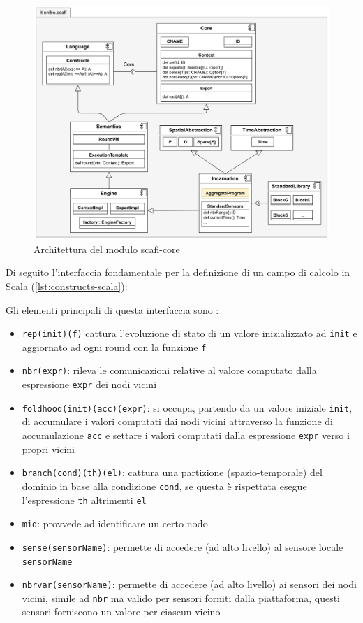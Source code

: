 \documentclass[12pt,a4paper,openright,twoside]{book}
\begin{document}
\begin{figure}
    \centering
    \includegraphics[width=.9\linewidth]{figures/core-arc.png}
    \caption{Architettura del modulo scafi-core}
    \label{fig:core-arc}
\end{figure}

Di seguito l'interfaccia fondamentale per la definizione di un campo di calcolo in Scala (\cref{lst:constructs-scala}):



Gli elementi principali di questa interfaccia sono \cite{Casadei2022}:
\begin{itemize}
    \item \verb|rep(init)(f)| cattura l'evoluzione di stato di un valore inizializzato ad \verb|init| e aggiornato ad ogni round con la funzione \verb|f|
    \item \verb|nbr(expr)|: rileva le comunicazioni relative al valore computato dalla espressione \verb|expr| dei nodi vicini
    \item \verb|foldhood(init)(acc)(expr)|: si occupa, partendo da un valore iniziale \verb|init|, di accumulare i valori computati dai nodi vicini attraverso la funzione di accumulazione \verb|acc| e settare i valori computati dalla espressione \verb|expr| verso i propri vicini
    \item \verb|branch(cond)(th)(el)|: cattura una partizione (spazio-temporale) del dominio in base alla condizione \verb|cond|, se questa è rispettata esegue l'espressione \verb|th| altrimenti \verb|el|
    \item \verb|mid|: provvede ad identificare un certo nodo
    \item \verb|sense(sensorName)|: permette di accedere (ad alto livello) al sensore locale \verb|sensorName|
    \item \verb|nbrvar(sensorName)|: permette di accedere (ad alto livello) ai sensori dei nodi vicini, simile ad \verb|nbr| ma valido per sensori forniti dalla piattaforma, questi sensori forniscono un valore per ciascun vicino
\end{itemize}
\end{document}
